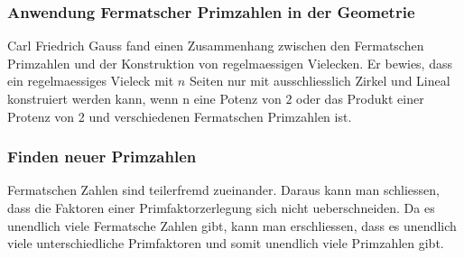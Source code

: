 \subsubsection{Anwendung Fermatscher Primzahlen in der Geometrie}
Carl Friedrich Gauss fand einen Zusammenhang zwischen den Fermatschen Primzahlen und der Konstruktion von regelmaessigen Vielecken. Er bewies, dass ein regelmaessiges Vieleck mit $n$ Seiten nur mit ausschliesslich Zirkel und Lineal konstruiert werden kann, wenn n eine Potenz von $2$ oder das Produkt einer Protenz von 2 und verschiedenen Fermatschen Primzahlen ist.
\subsubsection{Finden neuer Primzahlen}
Fermatschen Zahlen sind teilerfremd zueinander. Daraus kann man schliessen, dass die Faktoren einer Primfaktorzerlegung sich nicht ueberschneiden. Da es unendlich viele Fermatsche Zahlen gibt, kann man erschliessen, dass es unendlich viele unterschiedliche Primfaktoren und somit unendlich viele Primzahlen gibt.

